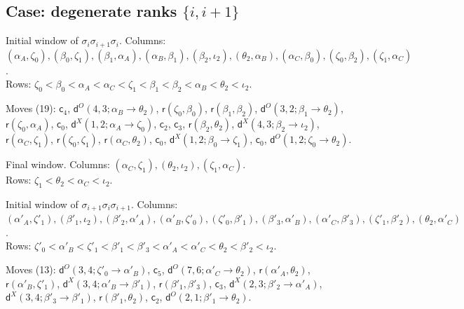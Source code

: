 \documentclass[11pt]{amsart}
\theoremstyle{definition}
\theoremstyle{remark}
\begin{document}
\subsection*{Case: degenerate ranks \texorpdfstring{$\{i,i+1\}$}{i,i+1}}
\noindent Initial window of $\sigma_i\sigma_{i+1}\sigma_i$. Columns: $(\alpha_A,\zeta_0),\allowbreak (\beta_0,\zeta_1),\allowbreak (\beta_1,\alpha_A),\allowbreak (\alpha_B,\beta_1),\allowbreak (\beta_2,\iota_2),\allowbreak (\theta_2,\alpha_B),\allowbreak (\alpha_C,\beta_0),\allowbreak (\zeta_0,\beta_2),\allowbreak (\zeta_1,\alpha_C)$.\\ Rows: $\zeta_0 <\allowbreak \beta_0 <\allowbreak \alpha_A <\allowbreak \alpha_C <\allowbreak \zeta_1 <\allowbreak \beta_1 <\allowbreak \beta_2 <\allowbreak \alpha_B <\allowbreak \theta_2 <\allowbreak \iota_2$.\par
\noindent Moves (19): $\mathsf{c}_{4}$, $\mathsf{d}^{O}(4,3;\alpha_B\to\theta_2)$, $\mathsf{r}(\zeta_0,\beta_0)$, $\mathsf{r}(\beta_1,\beta_2)$, $\mathsf{d}^{O}(3,2;\beta_1\to\theta_2)$, $\mathsf{r}(\zeta_0,\alpha_A)$, $\mathsf{c}_{0}$, $\mathsf{d}^{X}(1,2;\alpha_A\to\zeta_0)$, $\mathsf{c}_{2}$, $\mathsf{c}_{3}$, $\mathsf{r}(\beta_2,\theta_2)$, $\mathsf{d}^{X}(4,3;\beta_2\to\iota_2)$, $\mathsf{r}(\alpha_C,\zeta_1)$, $\mathsf{r}(\zeta_0,\zeta_1)$, $\mathsf{r}(\alpha_C,\theta_2)$, $\mathsf{c}_{0}$, $\mathsf{d}^{X}(1,2;\beta_0\to\zeta_1)$, $\mathsf{c}_{0}$, $\mathsf{d}^{O}(1,2;\zeta_0\to\theta_2)$.\par
\noindent Final window. Columns: $(\alpha_C,\zeta_1),\allowbreak (\theta_2,\iota_2),\allowbreak (\zeta_1,\alpha_C)$.\\ Rows: $\zeta_1 <\allowbreak \theta_2 <\allowbreak \alpha_C <\allowbreak \iota_2$.\par\medskip
\noindent Initial window of $\sigma_{i+1}\sigma_i\sigma_{i+1}$. Columns: $(\alpha'_A,\zeta'_1),\allowbreak (\beta'_1,\iota_2),\allowbreak (\beta'_2,\alpha'_A),\allowbreak (\alpha'_B,\zeta'_0),\allowbreak (\zeta'_0,\beta'_1),\allowbreak (\beta'_3,\alpha'_B),\allowbreak (\alpha'_C,\beta'_3),\allowbreak (\zeta'_1,\beta'_2),\allowbreak (\theta_2,\alpha'_C)$.\\ Rows: $\zeta'_0 <\allowbreak \alpha'_B <\allowbreak \zeta'_1 <\allowbreak \beta'_1 <\allowbreak \beta'_3 <\allowbreak \alpha'_A <\allowbreak \alpha'_C <\allowbreak \theta_2 <\allowbreak \beta'_2 <\allowbreak \iota_2$.\par
\noindent Moves (13): $\mathsf{d}^{O}(3,4;\zeta'_0\to\alpha'_B)$, $\mathsf{c}_{5}$, $\mathsf{d}^{O}(7,6;\alpha'_C\to\theta_2)$, $\mathsf{r}(\alpha'_A,\theta_2)$, $\mathsf{r}(\alpha'_B,\zeta'_1)$, $\mathsf{d}^{X}(3,4;\alpha'_B\to\beta'_1)$, $\mathsf{r}(\beta'_1,\beta'_3)$, $\mathsf{c}_{3}$, $\mathsf{d}^{X}(2,3;\beta'_2\to\alpha'_A)$, $\mathsf{d}^{X}(3,4;\beta'_3\to\beta'_1)$, $\mathsf{r}(\beta'_1,\theta_2)$, $\mathsf{c}_{2}$, $\mathsf{d}^{O}(2,1;\beta'_1\to\theta_2)$.\par
\end{document}
